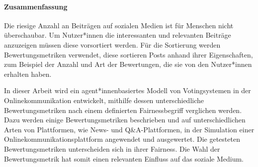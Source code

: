 \markboth{}{}
\paragraph{Zusammenfassung}
Die riesige Anzahl an Beiträgen auf sozialen Medien ist für Menschen nicht überschaubar. Um Nutzer*innen die interessanten und relevanten Beiträge anzuzeigen müssen diese vorsortiert werden. Für die Sortierung werden Bewertungsmetriken verwendet, diese sortieren Posts anhand ihrer Eigenschaften, zum Beispiel der Anzahl und Art der Bewertungen, die sie von den Nutzer*innen erhalten haben.

In dieser Arbeit wird ein agent*innenbasiertes Modell von Votingsystemen in der Onlinekommunikation entwickelt, mithilfe dessen unterschiedliche Bewertungsmetriken nach einem definierten Fairnessbegriff verglichen werden. Dazu werden einige Bewertungsmetriken beschrieben und auf unterschiedlichen Arten von Plattformen, wie News- und Q\&A-Plattformen, in der Simulation einer Onlinekommunikationsplattform angewendet und ausgewertet. Die getesteten Bewertungsmetriken unterscheiden sich in ihrer Fairness. Die Wahl der Bewertungsmetrik hat somit einen relevanten Einfluss auf das soziale Medium.
	
	